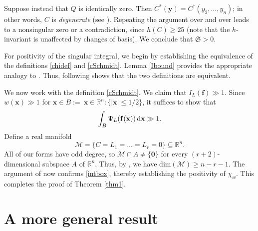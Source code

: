 \documentclass[12pt,reqno]{amsart}
\theoremstyle{definition}
\theoremstyle{remark}
\numberwithin{equation}{section}
\begin{document}
Suppose instead that $Q$ is identically zero. Then $C^*({\mathbf y}) = C^{\dagger}(y_2, \ldots, y_n)$; in other words, $C$ is \emph{degenerate} (see \cite[p. 68]{Dav2005}). Repeating the argument over and over leads to a nonsingular zero or a contradiction, since $h(C) {\geqslant} 25$ (note that the $h$-invariant is unaffected by changes of basis). We conclude that ${\mathfrak S} > 0$.

For positivity of the singular integral, we begin by establishing the equivalence of the definitions \eqref{chidef} and \eqref{cSchmidt}. Lemma \ref{Ibound} provides the appropriate analogy to \cite[Lemma 11]{Sch1982b}. Thus, following \cite[ch. 11]{Sch1982b} shows that the two definitions are equivalent.

We now work with the definition \eqref{cSchmidt}. We claim that $I_L({\mathbf f}) \gg 1$. Since $w({\mathbf x}) \gg 1$ for ${\mathbf x} \in B := \ {\mathbf x} \in {\mathbb R}^n: \{ |{\mathbf x}| {\leqslant} 1/2 \}$, it suffices to show that
\begin{equation} \label{intbox}
\int_B \Psi_L({\mathbf f}({\mathbf x})) {{\,{\rm d}}} {\mathbf x} \gg 1.
\end{equation}
Define a real manifold
\[
{\mathcal M} = \{ C = L_1 = \ldots = L_r = 0 \} \subseteq {\mathbb R}^n.
\]
All of our forms have odd degree, so ${\mathcal M} \cap A \ne \{ {\mathbf 0} \}$ for every $(r+2)$-dimensional subspace $A$ of ${\mathbb R}^n$. Thus, by \cite[Lemma 1]{Sch1982a}, we have ${\mathrm{dim}}({\mathcal M}) {\geqslant} n-r-1$. The argument of \cite[Lemma 2]{Sch1982b} now confirms \eqref{intbox}, thereby establishing the positivity of $\chi_w$. This completes the proof of Theorem \ref{thm1}.

\section{A more general result}
\label{general}
\end{document}
